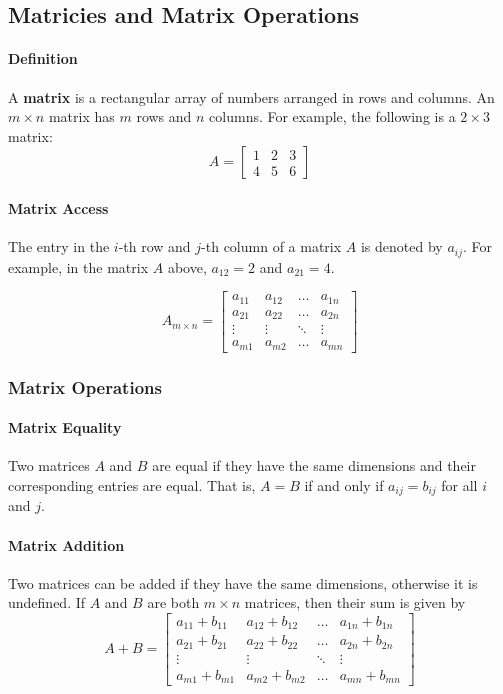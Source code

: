 \subsection{Matricies and Matrix Operations}
\hrulefill

\paragraph*{Definition} A \textbf{matrix} is a rectangular array of numbers arranged in rows and columns. An $m \times n$ matrix has $m$ rows and $n$ columns. For example, the following is a $2 \times 3$ matrix:
\[A = \begin{bmatrix}
    1 & 2 & 3 \\
    4 & 5 & 6
\end{bmatrix}\]

\paragraph*{Matrix Access} The entry in the $i$-th row and $j$-th column of a matrix $A$ is denoted by $a_{ij}$. For example, in the matrix $A$ above, $a_{12} = 2$ and $a_{21} = 4$.

\[A_{m \times n} = \begin{bmatrix}
    a_{11} & a_{12} & \ldots & a_{1n} \\
    a_{21} & a_{22} & \ldots & a_{2n} \\
    \vdots & \vdots & \ddots & \vdots \\
    a_{m1} & a_{m2} & \ldots & a_{mn}
\end{bmatrix}\]

\subsubsection*{Matrix Operations}

\paragraph*{Matrix Equality} Two matrices $A$ and $B$ are equal if they have the same dimensions and their corresponding entries are equal. That is, $A = B$ if and only if $a_{ij} = b_{ij}$ for all $i$ and $j$.

\paragraph*{Matrix Addition} Two matrices can be added if they have the same dimensions, otherwise it is undefined. If $A$ and $B$ are both $m \times n$ matrices, then their sum is given by
\[A + B = \begin{bmatrix}
    a_{11} + b_{11} & a_{12} + b_{12} & \ldots & a_{1n} + b_{1n} \\
    a_{21} + b_{21} & a_{22} + b_{22} & \ldots & a_{2n} + b_{2n} \\
    \vdots & \vdots & \ddots & \vdots \\
    a_{m1} + b_{m1} & a_{m2} + b_{m2} & \ldots & a_{mn} + b_{mn}
\end{bmatrix}\]

